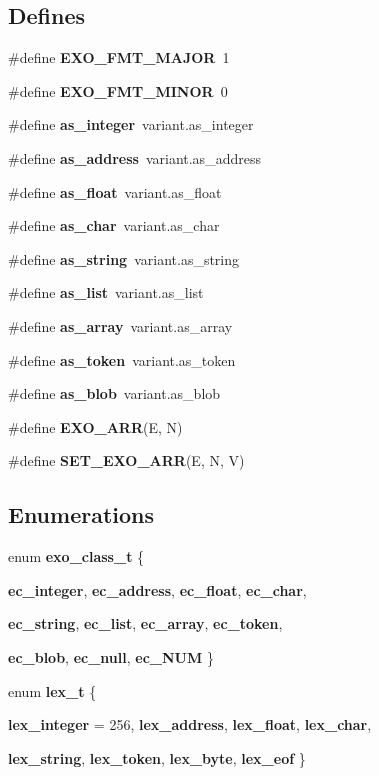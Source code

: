 \subsection*{Defines}
\begin{CompactItemize}
\item 
\#define {\bf EXO\_\-FMT\_\-MAJOR}~1
\item 
\#define {\bf EXO\_\-FMT\_\-MINOR}~0
\item 
\#define {\bf as\_\-integer}~variant.as\_\-integer
\item 
\#define {\bf as\_\-address}~variant.as\_\-address
\item 
\#define {\bf as\_\-float}~variant.as\_\-float
\item 
\#define {\bf as\_\-char}~variant.as\_\-char
\item 
\#define {\bf as\_\-string}~variant.as\_\-string
\item 
\#define {\bf as\_\-list}~variant.as\_\-list
\item 
\#define {\bf as\_\-array}~variant.as\_\-array
\item 
\#define {\bf as\_\-token}~variant.as\_\-token
\item 
\#define {\bf as\_\-blob}~variant.as\_\-blob
\item 
\#define {\bf EXO\_\-ARR}(E, N)
\item 
\#define {\bf SET\_\-EXO\_\-ARR}(E, N, V)
\end{CompactItemize}
\subsection*{Enumerations}
\begin{CompactItemize}
\item 
enum {\bf exo\_\-class\_\-t} \{ \par
{\bf ec\_\-integer}, 
{\bf ec\_\-address}, 
{\bf ec\_\-float}, 
{\bf ec\_\-char}, 
\par
{\bf ec\_\-string}, 
{\bf ec\_\-list}, 
{\bf ec\_\-array}, 
{\bf ec\_\-token}, 
\par
{\bf ec\_\-blob}, 
{\bf ec\_\-null}, 
{\bf ec\_\-NUM}
 \}
\item 
enum {\bf lex\_\-t} \{ \par
{\bf lex\_\-integer} =  256, 
{\bf lex\_\-address}, 
{\bf lex\_\-float}, 
{\bf lex\_\-char}, 
\par
{\bf lex\_\-string}, 
{\bf lex\_\-token}, 
{\bf lex\_\-byte}, 
{\bf lex\_\-eof}
 \}
\end{CompactItemize}
